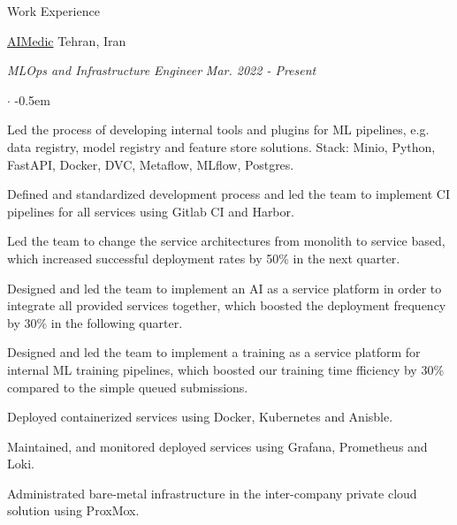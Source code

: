 \documentclass[../professional-cv.tex]{subfiles}
\begin{document}
	\begin{rSection}{Work Experience}
		
		\begin{rWorkSection}
			{\href{https://aimedic.co/}{AIMedic}}
			{Tehran, Iran}
			
			\vspace{-1em}
			{\em MLOps and Infrastructure Engineer} \hfill {\em Mar. 2022 - Present} \hspace{10pt}
			\normalfont
			\begin{list}{$\cdot$}{\leftmargin=10pt\normalfont \rightmargin=20pt}
				\itemsep -0.5em
				\item Led the process of developing internal tools and plugins for ML pipelines, e.g. data registry, model registry and feature store solutions. Stack: Minio, Python, FastAPI, Docker, DVC, Metaflow, MLflow, Postgres.
				\item Defined and standardized development process and led the team to implement CI pipelines for all services using Gitlab CI and Harbor.
				\item Led the team to change the service architectures from monolith to service based, which increased successful deployment rates by 50\% in the next quarter.
				\item Designed and led the team to implement an AI as a service platform in order to integrate all provided services together, which boosted the deployment frequency by 30\% in the following quarter.
				\item Designed and led the team to implement a training as a service platform for internal ML training pipelines, which boosted our training time fficiency by 30\% compared to the simple queued submissions.
				\item Deployed containerized services using Docker, Kubernetes and Anisble.
				\item Maintained, and monitored deployed services using Grafana, Prometheus and Loki.
				\item Administrated bare-metal infrastructure in the inter-company private cloud solution using ProxMox.
						

\end{list}
\end{rWorkSection}
\end{rSection}
\end{document}

